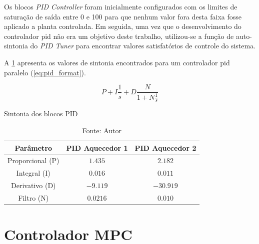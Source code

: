 Os blocos \textit{PID Controller} foram inicialmente configurados com os limites de saturação de saída
entre 0 e 100 para que nenhum valor fora desta faixa fosse aplicado a planta controlada.
Em seguida, uma vez que o desenvolvimento do controlador \acrshort{pid} não era um objetivo deste trabalho,
utilizou-se a função de auto-sintonia do \textit{PID Tuner} para encontrar valores satisfatórios de controle
do sistema.

A \cref{tab:pid_values} apresenta os valores de sintonia encontrados para um controlador \acrshort{pid}
paralelo (\cref{eq:pid_format}).

\begin{equation}
    \label{eq:pid_format}
    P + I \frac{1}{s} + D \frac{N}{1 + N \frac{1}{s}}
\end{equation}

\begin{table}[h]
	\centering
	\caption{Sintonia dos blocos PID}
	\label{tab:pid_values}
	\begin{tabular}{c|cc} \toprule
		{Parâmetro}		            & {PID Aquecedor 1}     & {PID Aquecedor 2}           \\ \midrule
		Proporcional (P)		    & $1.435$               & $2.182$                     \\
		Integral (I)   		        & $0.016$               & $0.011$                     \\
		Derivativo (D)		        & $-9.119$              & $-30.919$                   \\
		Filtro (N)                  & $0.0216$              & $0.010$                     \\ \bottomrule
	\end{tabular}
	\caption*{Fonte: Autor}
\end{table}


\section{Controlador MPC}
\label{sec:controlador_mpc}